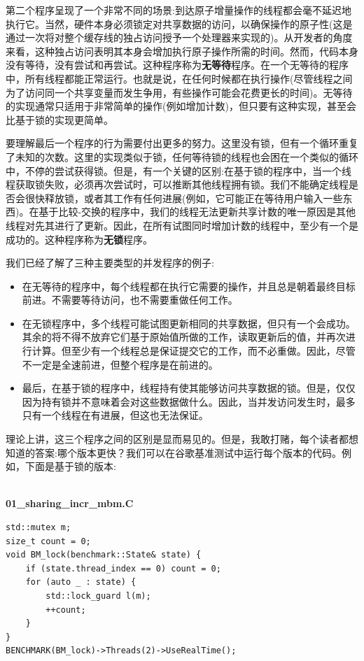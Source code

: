第二个程序呈现了一个非常不同的场景:到达原子增量操作的线程都会毫不延迟地执行它。当然，硬件本身必须锁定对共享数据的访问，以确保操作的原子性(这是通过一次将对整个缓存线的独占访问授予一个处理器来实现的)。从开发者的角度来看，这种独占访问表明其本身会增加执行原子操作所需的时间。然而，代码本身没有等待，没有尝试和再尝试。这种程序称为\textbf{无等待}程序。在一个无等待的程序中，所有线程都能正常运行。也就是说，在任何时候都在执行操作(尽管线程之间为了访问同一个共享变量而发生争用，有些操作可能会花费更长的时间)。无等待的实现通常只适用于非常简单的操作(例如增加计数)，但只要有这种实现，甚至会比基于锁的实现更简单。

要理解最后一个程序的行为需要付出更多的努力。这里没有锁，但有一个循环重复了未知的次数。这里的实现类似于锁，任何等待锁的线程也会困在一个类似的循环中，不停的尝试获得锁。但是，有一个关键的区别:在基于锁的程序中，当一个线程获取锁失败，必须再次尝试时，可以推断其他线程拥有锁。我们不能确定线程是否会很快释放锁，或者其工作有任何进展(例如，它可能正在等待用户输入一些东西)。在基于比较-交换的程序中，我们的线程无法更新共享计数的唯一原因是其他线程对先其进行了更新。因此，在所有试图同时增加计数的线程中，至少有一个是成功的。这种程序称为\textbf{无锁}程序。

我们已经了解了三种主要类型的并发程序的例子:

\begin{itemize}
\item 在无等待的程序中，每个线程都在执行它需要的操作，并且总是朝着最终目标前进。不需要等待访问，也不需要重做任何工作。

\item 在无锁程序中，多个线程可能试图更新相同的共享数据，但只有一个会成功。其余的将不得不放弃它们基于原始值所做的工作，读取更新后的值，并再次进行计算。但至少有一个线程总是保证提交它的工作，而不必重做。因此，尽管不一定是全速前进，但整个程序是在前进的。

\item 最后，在基于锁的程序中，线程持有使其能够访问共享数据的锁。但是，仅仅因为持有锁并不意味着会对这些数据做什么。因此，当并发访问发生时，最多只有一个线程在有进展，但这也无法保证。
\end{itemize}

理论上讲，这三个程序之间的区别是显而易见的。但是，我敢打赌，每个读者都想知道的答案:哪个版本更快？我们可以在谷歌基准测试中运行每个版本的代码。例如，下面是基于锁的版本:

\hspace*{\fill} \\ %
\noindent
\textbf{01\_sharing\_incr\_mbm.C}
\begin{lstlisting}[style=styleCXX]
std::mutex m;
size_t count = 0;
void BM_lock(benchmark::State& state) {
	if (state.thread_index == 0) count = 0;
	for (auto _ : state) {
		std::lock_guard l(m);
		++count;
	}
}
BENCHMARK(BM_lock)->Threads(2)->UseRealTime();
\end{lstlisting}

